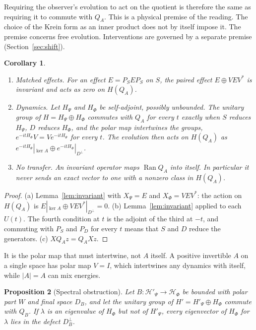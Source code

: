 \documentclass[11pt]{article}
\newtheorem{proposition}{Proposition}
\newtheorem{corollary}[proposition]{Corollary}
\theoremstyle{remark}
\newcommand{\HF}{\mathcal H_\Phi}
\newcommand{\Ran}{\operatorname{Ran}}
\begin{document}
Requiring the observer's evolution to act on the quotient is therefore the same as requiring it to commute with $Q_A$. This is a physical premise of the reading. The choice of the Krein form as an inner product does not by itself impose it. The premise concerns free evolution. Interventions are governed by a separate premise (Section~\ref{sec:shift}).

\begin{corollary}\label{cor:consequences}
\begin{enumerate}
\item[(a)] \emph{Matched effects.} For an effect $E=P_SEP_S$ on $S$, the paired effect $E\oplus VEV^*$ is invariant and acts as zero on $H(Q_A)$.
\item[(b)] \emph{Dynamics.} Let $H_\Psi$ and $H_\Phi$ be self-adjoint, possibly unbounded. The unitary group of $H=H_\Psi\oplus H_\Phi$ commutes with $Q_A$ for every $t$ exactly when $S$ reduces $H_\Psi$, $D$ reduces $H_\Phi$, and the polar map intertwines the groups, $e^{-itH_\Phi}V=Ve^{-itH_\Psi}$ for every $t$. The evolution then acts on $H(Q_A)$ as $e^{-itH_\Psi}|_{\ker A}\oplus e^{-itH_\Phi}|_{D^\perp}$.
\item[(c)] \emph{No transfer.} An invariant operator maps $\Ran Q_A$ into itself. In particular it never sends an exact vector to one with a nonzero class in $H(Q_A)$.
\end{enumerate}
\end{corollary}

\begin{proof}
(a) Lemma~\ref{lem:invariant} with $X_\Psi=E$ and $X_\Phi=VEV^*$: the action on $H(Q_A)$ is $E|_{\ker A}\oplus VEV^*|_{D^\perp}=0$. (b) Lemma~\ref{lem:invariant} applied to each $U(t)$. The fourth condition at $t$ is the adjoint of the third at $-t$, and commuting with $P_S$ and $P_D$ for every $t$ means that $S$ and $D$ reduce the generators. (c) $X Q_Az=Q_AXz$.
\end{proof}

It is the polar map that must intertwine, not $A$ itself. A positive invertible $A$ on a single space has polar map $V=I$, which intertwines any dynamics with itself, while $|A|=A$ can mix energies.

\begin{proposition}[Spectral obstruction]\label{prop:obstruction}
Let $B:\mathcal H'_\Psi\to\HF$ be bounded with polar part $W$ and final space $D_B$, and let the unitary group of $H'=H'_\Psi\oplus H_\Phi$ commute with $Q_B$. If $\lambda$ is an eigenvalue of $H_\Phi$ but not of $H'_\Psi$, every eigenvector of $H_\Phi$ for $\lambda$ lies in the defect $D_B^\perp$.
\end{proposition}
\end{document}
